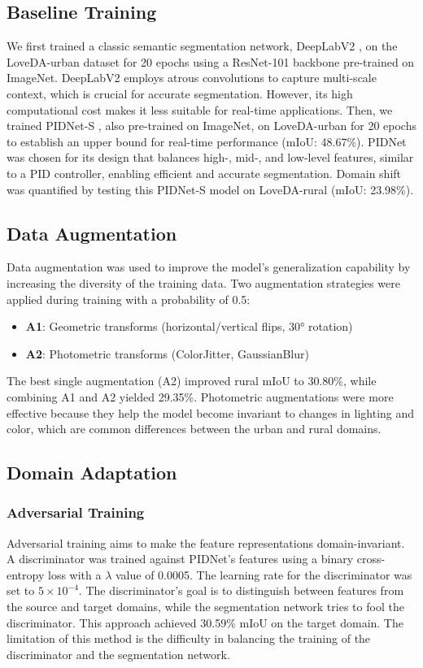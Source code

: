\documentclass{article}
\begin{document}
\begin{multicols}{2}
		\subsection{Baseline Training}
		We first trained a classic semantic segmentation network, DeepLabV2 \cite{chen2018deeplab}, on the LoveDA-urban dataset for 20 epochs using a ResNet-101 backbone \cite{he2016deep} pre-trained on ImageNet. DeepLabV2 employs atrous convolutions to capture multi-scale context, which is crucial for accurate segmentation. However, its high computational cost makes it less suitable for real-time applications. Then, we trained PIDNet-S \cite{pidnet2023}, also pre-trained on ImageNet, on LoveDA-urban for 20 epochs to establish an upper bound for real-time performance (mIoU: 48.67\%). PIDNet was chosen for its design that balances high-, mid-, and low-level features, similar to a PID controller, enabling efficient and accurate segmentation. Domain shift was quantified by testing this PIDNet-S model on LoveDA-rural (mIoU: 23.98\%).
		
		\subsection{Data Augmentation}
		Data augmentation was used to improve the model's generalization capability by increasing the diversity of the training data. Two augmentation strategies were applied during training with a probability of 0.5:
		\begin{itemize}
			\item \textbf{A1}: Geometric transforms (horizontal/vertical flips, 30° rotation)
			\item \textbf{A2}: Photometric transforms (ColorJitter, GaussianBlur)
		\end{itemize}
		The best single augmentation (A2) improved rural mIoU to 30.80\%, while combining A1 and A2 yielded 29.35\%. Photometric augmentations were more effective because they help the model become invariant to changes in lighting and color, which are common differences between the urban and rural domains.
		\subsection{Domain Adaptation}
		\subsubsection{Adversarial Training}
		Adversarial training aims to make the feature representations domain-invariant. A discriminator \cite{tsai2018learning} was trained against PIDNet's features using a binary cross-entropy loss with a $\lambda$ value of 0.0005. The learning rate for the discriminator was set to $5 \times 10^{-4}$. The discriminator's goal is to distinguish between features from the source and target domains, while the segmentation network tries to fool the discriminator. This approach achieved 30.59\% mIoU on the target domain. The limitation of this method is the difficulty in balancing the training of the discriminator and the segmentation network.
		

\end{multicols}
\end{document}
